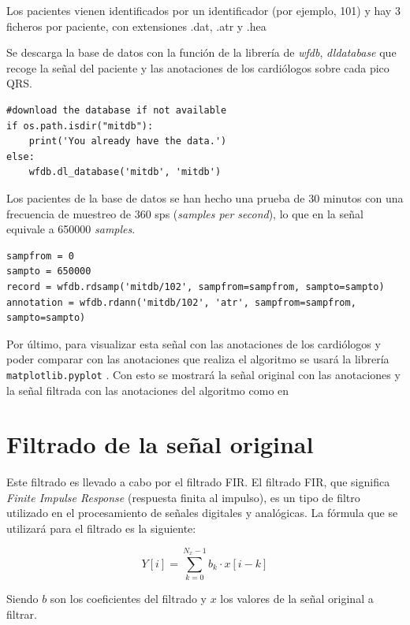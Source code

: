 Los pacientes vienen identificados por un identificador (por ejemplo, 101) y hay 3 ficheros por paciente, 
con extensiones .dat, .atr y .hea

Se descarga la base de datos \cite{mitdb} con la función de la librería de \textit{wfdb}, \textit{dldatabase} que recoge 
la señal del paciente y las anotaciones de los cardiólogos sobre cada pico QRS.


\lstset{language=python, breaklines=true, basicstyle=\footnotesize}
\begin{lstlisting}[frame=single]
#download the database if not available
if os.path.isdir("mitdb"):
	print('You already have the data.')
else:
	wfdb.dl_database('mitdb', 'mitdb')
\end{lstlisting}

Los pacientes de la base de datos se han hecho una prueba de 30 minutos con una frecuencia de muestreo de 360 sps (\textit{samples per second}), lo que en la señal 
equivale a 650000 \textit{samples}.

\lstset{language=python, breaklines=true, basicstyle=\footnotesize}
\begin{lstlisting}[frame=single]
sampfrom = 0
sampto = 650000
record = wfdb.rdsamp('mitdb/102', sampfrom=sampfrom, sampto=sampto)
annotation = wfdb.rdann('mitdb/102', 'atr', sampfrom=sampfrom, sampto=sampto)
\end{lstlisting}

Por último, para visualizar esta señal con las anotaciones de los cardiólogos y poder comparar con las anotaciones que realiza el algoritmo se usará la librería \texttt{matplotlib.pyplot} \cite{Matplotlib}. Con esto se mostrará la señal original con las anotaciones y la señal filtrada con las anotaciones del algoritmo como en 

\section{Filtrado de la señal original}
Este filtrado es llevado a cabo por el filtrado FIR\cite{FIR}. El filtrado FIR, que significa \textit{Finite Impulse Response} (respuesta finita al impulso), es un tipo de filtro utilizado en el procesamiento de señales digitales y analógicas. La fórmula que se utilizará para el filtrado es la siguiente:

\[ Y[i] = \sum_{k=0}^{N_x -1} b_k \cdot x[i-k] \]

Siendo $b$ son los coeficientes del filtrado y $x$ los valores de la señal original a filtrar.

